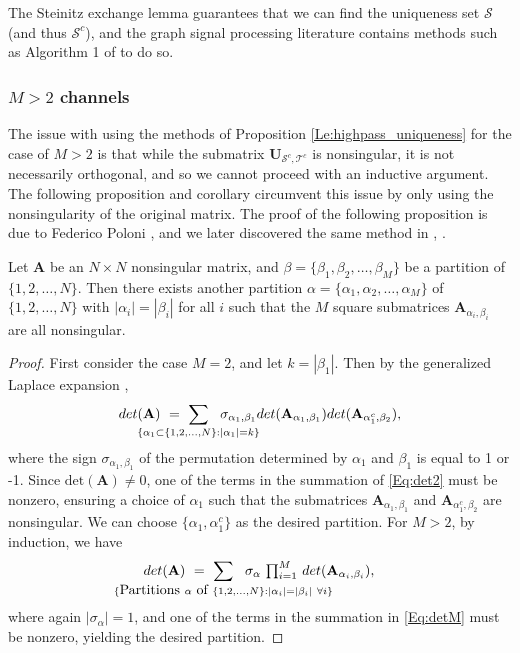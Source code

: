\documentclass[journal, 10pt]{IEEEtran}
\begin{document}
The Steinitz exchange lemma \cite{steinitz} guarantees that we can find the uniqueness set $\mathcal{S}$ (and thus $\mathcal{S}^c$), and the graph signal processing literature contains methods such as Algorithm 1 of \cite{shomorony} to do so.

\subsubsection{$M>2$ channels}
The issue with using the methods of Proposition \ref{Le:highpass_uniqueness} for the case of $M>2$ is that while the submatrix ${\mathbf{U}}_{{\mathcal S^c},{\mathcal T^c}}$ is nonsingular, it is not necessarily orthogonal, and so we cannot proceed with an inductive argument. The following proposition and corollary circumvent this issue by only using the nonsingularity of the original matrix. The proof of the following proposition is due to Federico Poloni \cite{poloni}, %
and we later discovered the same method in \cite{greeneMultiple}, \cite[Theorem 3.3]{greene_magnanti}.
\begin{proposition}\label{Pr:mat_part}
Let $\mathbf{A}$ be an $N \times N$ nonsingular matrix, and $\beta=\{\beta_1,\beta_2,\ldots,\beta_M\}$ be a partition of $\{1,2,\ldots,N\}$. Then there exists another partition $\alpha=\{\alpha_1,\alpha_2,\ldots,\alpha_M\}$ of $\{1,2,\ldots,N\}$ with $|\alpha_i|=|\beta_i|$ for all $i$ such that the $M$ square submatrices $\mathbf{A}_{\alpha_i,\beta_i}$ are all nonsingular.
\end{proposition}
\begin{proof}%
First consider the case $M=2$, and let $k=|\beta_1|$. Then by the generalized Laplace expansion \cite{gle}, 
\begin{align}\label{Eq:det2}
\mbox{det}(\mathbf{A})~=~\sum_{\mathclap{\{\alpha_1 \subset \{1,2,\ldots,N\}: |\alpha_1|=k \}}}~~\sigma_{\alpha_1,\beta_1} \mbox{det}(\mathbf{A}_{\alpha_1,\beta_1})\mbox{det}(\mathbf{A}_{\alpha_1^c,\beta_2}),
\end{align}
where the sign $\sigma_{\alpha_1,\beta_1}$ of the permutation determined by $\alpha_1$ and $\beta_1$ is equal to 1 or -1. Since $\mbox{det}(\mathbf{A})\neq 0$, one of the terms in the summation of \eqref{Eq:det2} must be nonzero, ensuring a choice of $\alpha_1$ such that the submatrices $\mathbf{A}_{\alpha_1,\beta_1}$ and $\mathbf{A}_{\alpha_1^c,\beta_2}$ are nonsingular. We can choose $\{\alpha_1,\alpha_1^c\}$ as the desired partition. For $M>2$, by induction, we have
\begin{align}\label{Eq:detM}
\mbox{det}(\mathbf{A})~=~\sum_{\mathclap{\{\hbox{Partitions } \alpha \hbox{ of }\{1,2,\ldots,N\}: |\alpha_i|=|\beta_i|~\forall i \}}}~~\sigma_{\alpha}~{\textstyle \prod_{i=1}^M}~\mbox{det}(\mathbf{A}_{\alpha_i,\beta_i}),
\end{align}
where again $|\sigma_\alpha|=1$, %
and one of the terms in the summation in \eqref{Eq:detM} must be nonzero, yielding the desired partition. 
\end{proof}
\end{document}

